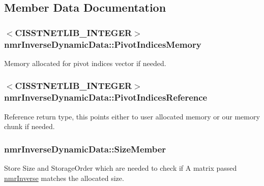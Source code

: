 \subsection{Member Data Documentation}
\hypertarget{classnmr_inverse_dynamic_data_a011a6d0e52a20011ac77ac48ea65dc1b}{}
\subsubsection[{Pivot\+Indices\+Memory}]{$<$C\+I\+S\+S\+T\+N\+E\+T\+L\+I\+B\+\_\+\+I\+N\+T\+E\+G\+E\+R$>$ nmr\+Inverse\+Dynamic\+Data\+::\+Pivot\+Indices\+Memory\hspace{0.3cm}{\ttfamily [protected]}}\label{classnmr_inverse_dynamic_data_a011a6d0e52a20011ac77ac48ea65dc1b}
Memory allocated for pivot indices vector if needed. \hypertarget{classnmr_inverse_dynamic_data_ad6e68ee1c9a9705d80c5b8e69c2ec34d}{}
\subsubsection[{Pivot\+Indices\+Reference}]{$<$C\+I\+S\+S\+T\+N\+E\+T\+L\+I\+B\+\_\+\+I\+N\+T\+E\+G\+E\+R$>$ nmr\+Inverse\+Dynamic\+Data\+::\+Pivot\+Indices\+Reference\hspace{0.3cm}{\ttfamily [protected]}}\label{classnmr_inverse_dynamic_data_ad6e68ee1c9a9705d80c5b8e69c2ec34d}
Reference return type, this points either to user allocated memory or our memory chunk if needed. \hypertarget{classnmr_inverse_dynamic_data_ae4b1064f9e37250025710add092a33cf}{}
\subsubsection[{Size\+Member}]{ nmr\+Inverse\+Dynamic\+Data\+::\+Size\+Member\hspace{0.3cm}{\ttfamily [protected]}}\label{classnmr_inverse_dynamic_data_ae4b1064f9e37250025710add092a33cf}
Store Size and Storage\+Order which are needed to check if A matrix passed \hyperlink{nmr_inverse_8h_a018d876444a46377abdd85e296643035}{nmr\+Inverse} matches the allocated size. \hypertarget{classnmr_inverse_dynamic_data_a295f57a6eaeca3374aa4e58e983ccefd}{}
